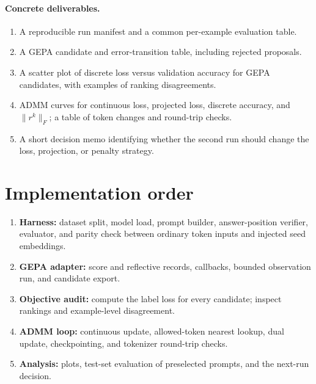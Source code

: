 \documentclass[11pt]{article}
\begin{document}
\paragraph{Concrete deliverables.}
\begin{enumerate}
\item A reproducible run manifest and a common per-example evaluation table.
\item A GEPA candidate and error-transition table, including rejected proposals.
\item A scatter plot of discrete loss versus validation accuracy for GEPA candidates, with examples of ranking disagreements.
\item ADMM curves for continuous loss, projected loss, discrete accuracy, and $\|r^k\|_F$; a table of token changes and round-trip checks.
\item A short decision memo identifying whether the second run should change the loss, projection, or penalty strategy.
\end{enumerate}

\section{Implementation order}
\begin{enumerate}
\item \textbf{Harness:} dataset split, model load, prompt builder, answer-position verifier, evaluator, and parity check between ordinary token inputs and injected seed embeddings.
\item \textbf{GEPA adapter:} score and reflective records, callbacks, bounded observation run, and candidate export.
\item \textbf{Objective audit:} compute the label loss for every candidate; inspect rankings and example-level disagreement.
\item \textbf{ADMM loop:} continuous update, allowed-token nearest lookup, dual update, checkpointing, and tokenizer round-trip checks.
\item \textbf{Analysis:} plots, test-set evaluation of preselected prompts, and the next-run decision.
\end{enumerate}
\end{document}

